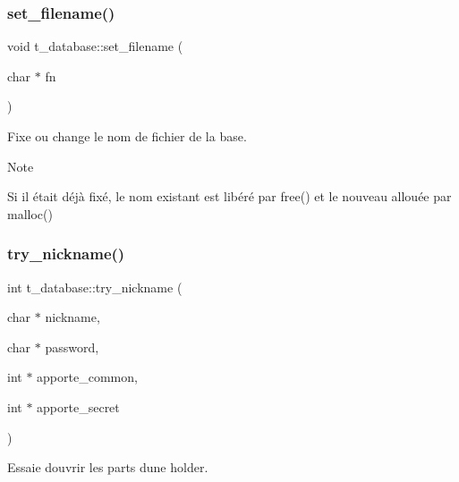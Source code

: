 \subsubsection{\texorpdfstring{set\+\_\+filename()}{set\_filename()}}
{\footnotesize\ttfamily void t\+\_\+database\+::set\+\_\+filename (\begin{DoxyParamCaption}\item[{char $\ast$}]{fn }\end{DoxyParamCaption})}



Fixe ou change le nom de fichier de la base. 

\begin{DoxyNote}{Note}

\begin{DoxyItemize}
\item Si il était déjà fixé, le nom existant est libéré par free() et le nouveau allouée par malloc() 
\end{DoxyItemize}
\end{DoxyNote}
\mbox{\label{classt__database_aa0838d708635fd5edf94ecfc15b31d0c}} 
\subsubsection{\texorpdfstring{try\+\_\+nickname()}{try\_nickname()}}
{\footnotesize\ttfamily int t\+\_\+database\+::try\+\_\+nickname (\begin{DoxyParamCaption}\item[{char $\ast$}]{nickname,  }\item[{char $\ast$}]{password,  }\item[{int $\ast$}]{apporte\+\_\+common,  }\item[{int $\ast$}]{apporte\+\_\+secret }\end{DoxyParamCaption})}



Essaie d\textquotesingle{}ouvrir les parts d\textquotesingle{}une holder. 


